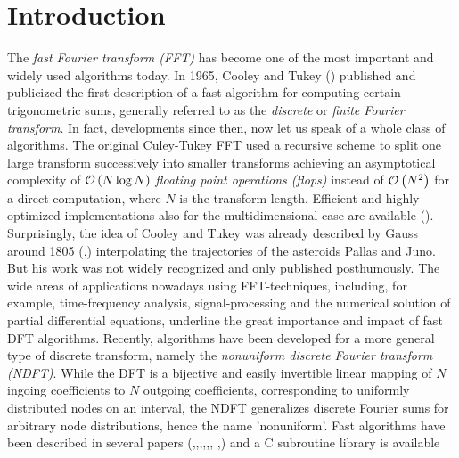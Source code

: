 
\chapter{Introduction}
\label{Introduction}

The \emph{fast Fourier transform (FFT)} has become one of the most important 
and widely used algorithms today. In 1965, Cooley and Tukey (\cite{cotu}) published
and publicized the first description of a fast algorithm for computing certain
trigonometric sums, generally referred to as the \emph{discrete} or 
\emph{finite Fourier transform}. In fact, developments since then, now
let us speak of a whole class of algorithms. The original Culey-Tukey FFT
used a recursive scheme to split one large transform successively into
smaller transforms achieving an asymptotical complexity of 
$\mathcal{O}\left(N \log N\right)$ \emph{floating point operations (flops)} instead of
$\mathcal{O}\left(N^2\right)$ for a direct computation, where $N$ is the transform length. 
Efficient and highly optimized implementations also for the
multidimensional case are available (\cite{fftw}).
Surprisingly, the idea of Cooley and Tukey was already described by Gauss around
1805 (\cite{gauss},\cite{hejobu}) interpolating the trajectories of the asteroids Pallas 
and Juno. But his work was not widely recognized and only published posthumously.
The wide areas of applications nowadays using FFT-techniques, including, for example, 
time-frequency analysis, signal-processing and the numerical solution of 
partial differential equations, underline the great importance and impact of fast
DFT algorithms.
Recently, algorithms have been developed for a more general type of discrete 
transform, namely the \emph{nonuniform discrete Fourier transform (NDFT)}. 
While the DFT is a bijective and easily invertible linear mapping of $N$ 
ingoing coefficients to $N$ outgoing coefficients, corresponding to
uniformly distributed nodes on an interval, the NDFT generalizes
discrete Fourier sums for arbitrary node distributions, hence the name
'nonuniform'. Fast algorithms have been described in several papers 
(\cite{bey95},\cite{duro93},\cite{fesu02},\cite{four},\cite{Ja},\cite{Pe},
\cite{scsc},\cite{ware98}) and a C subroutine library is available 
